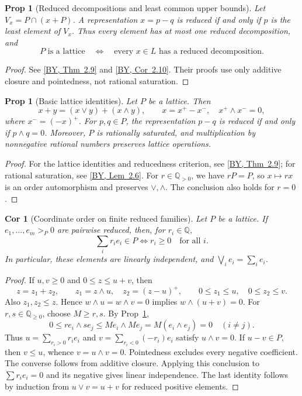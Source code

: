 \documentclass[10pt,letterpaper]{amsart}
\numberwithin{equation}{section}
\newtheorem{prop}[thm]{Prop}
\newtheorem{cor}[thm]{Cor}
\theoremstyle{definition}
\newcommand{\Q}{\mathbb Q}
\newcommand{\byref}[2]{\href{https://arxiv.org/pdf/2610.38300v1\#page=#1}{[BY, #2]}}
\begin{document}
\begin{prop}[Reduced decompositions and least common upper bounds]\label{prop:reduced-min}
Let $V_x=P\cap(x+P)$. A representation $x=p-q$ is reduced if and only if $p$ is the least element of $V_x$. Thus every element has at most one reduced decomposition, and
\[
P\text{ is a lattice}\quad\Longleftrightarrow\quad
\text{every }x\in L\text{ has a reduced decomposition}.
\]
\end{prop}
\begin{proof}
See \byref{6}{Thm~2.9} and \byref{7}{Cor~2.10}. Their proofs use only additive closure and pointedness, not rational saturation.
\end{proof}

\begin{prop}[Basic lattice identities]\label{prop:lattice-basics}
Let $P$ be a lattice. Then
\[
x+y=(x\vee y)+(x\wedge y),\qquad
x=x^+-x^-,\quad x^+\wedge x^-=0,
\]
where $x^-=(-x)^+$. For $p,q\in P$, the representation $p-q$ is reduced if and only if $p\wedge q=0$. Moreover, $P$ is rationally saturated, and multiplication by nonnegative rational numbers preserves lattice operations.
\end{prop}
\begin{proof}
For the lattice identities and reducedness criterion, see \byref{6}{Thm~2.9}; for rational saturation, see \byref{5}{Lem~2.6}.
For $r\in\Q_{>0}$, we have $rP=P$, so $x\mapsto rx$ is an order automorphism and preserves $\vee,\wedge$. The conclusion also holds for $r=0$.
\end{proof}

\begin{cor}[Coordinate order on finite reduced families]\label{cor:disjoint-coordinates}
Let $P$ be a lattice. If $e_1,\ldots,e_m>_P0$ are pairwise reduced, then, for $r_i\in\Q$,
\[
\sum_i r_i e_i\in P\iff r_i\ge0\quad\text{for all }i.
\]
In particular, these elements are linearly independent, and $\bigvee_i e_i=\sum_i e_i$.
\end{cor}
\begin{proof}
If $u,v\ge0$ and $0\le z\le u+v$, then
\[
z=z_1+z_2,\qquad z_1=z\wedge u,\quad z_2=(z-u)^+,
\qquad 0\le z_1\le u,\quad0\le z_2\le v.
\]
Also $z_1,z_2\le z$. Hence $w\wedge u=w\wedge v=0$ implies $w\wedge(u+v)=0$.
For $r,s\in\Q_{\ge0}$, choose $M\ge r,s$. By Prop~\ref{prop:lattice-basics},
\[
0\le re_i\wedge se_j\le Me_i\wedge Me_j=M(e_i\wedge e_j)=0\quad(i\ne j).
\]
Thus $u=\sum_{r_i>0}r_ie_i$ and $v=\sum_{r_i<0}(-r_i)e_i$ satisfy $u\wedge v=0$.
If $u-v\in P$, then $v\le u$, whence $v=u\wedge v=0$. Pointedness excludes every negative coefficient. The converse follows from additive closure.
Applying this conclusion to $\sum r_ie_i=0$ and its negative gives linear independence. The last identity follows by induction from $u\vee v=u+v$ for reduced positive elements.
\end{proof}
\end{document}
